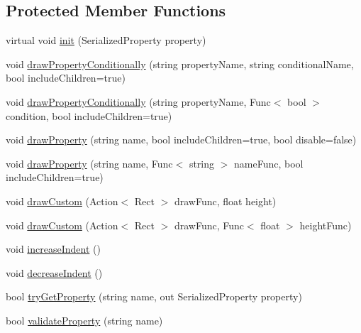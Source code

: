 \subsection*{Protected Member Functions}
\begin{DoxyCompactItemize}
\item 
virtual void \mbox{\hyperlink{class_leap_1_1_unity_1_1_custom_property_drawer_base_a1db92388446d13bf0e497f47b4fbc06a}{init}} (Serialized\+Property property)
\item 
void \mbox{\hyperlink{class_leap_1_1_unity_1_1_custom_property_drawer_base_ae8ffab0ab4a37260bbd0855e530c21f3}{draw\+Property\+Conditionally}} (string property\+Name, string conditional\+Name, bool include\+Children=true)
\item 
void \mbox{\hyperlink{class_leap_1_1_unity_1_1_custom_property_drawer_base_ab4f0ecabdcb89d099b1b9ad6c71f1e0d}{draw\+Property\+Conditionally}} (string property\+Name, Func$<$ bool $>$ condition, bool include\+Children=true)
\item 
void \mbox{\hyperlink{class_leap_1_1_unity_1_1_custom_property_drawer_base_a4e6c925f85520c7ffdb8498fed683d22}{draw\+Property}} (string name, bool include\+Children=true, bool disable=false)
\item 
void \mbox{\hyperlink{class_leap_1_1_unity_1_1_custom_property_drawer_base_a5490dfb02384c005ddd9d65c39e72132}{draw\+Property}} (string name, Func$<$ string $>$ name\+Func, bool include\+Children=true)
\item 
void \mbox{\hyperlink{class_leap_1_1_unity_1_1_custom_property_drawer_base_a8fc359bb586463a7b8c7672c7dd1cc60}{draw\+Custom}} (Action$<$ Rect $>$ draw\+Func, float height)
\item 
void \mbox{\hyperlink{class_leap_1_1_unity_1_1_custom_property_drawer_base_a6fc64f4861bd0657b3a9a97140a996b5}{draw\+Custom}} (Action$<$ Rect $>$ draw\+Func, Func$<$ float $>$ height\+Func)
\item 
void \mbox{\hyperlink{class_leap_1_1_unity_1_1_custom_property_drawer_base_a2a57e8f6b5ac89d2616b44f4819dc117}{increase\+Indent}} ()
\item 
void \mbox{\hyperlink{class_leap_1_1_unity_1_1_custom_property_drawer_base_aa29f79e7f8dc83ff5625aee15a60087b}{decrease\+Indent}} ()
\item 
bool \mbox{\hyperlink{class_leap_1_1_unity_1_1_custom_property_drawer_base_a9a48ff6212e10ab69a24c538226a8466}{try\+Get\+Property}} (string name, out Serialized\+Property property)
\item 
bool \mbox{\hyperlink{class_leap_1_1_unity_1_1_custom_property_drawer_base_a7b61387c6f2b8fd23cf9260000a1152f}{validate\+Property}} (string name)
\end{DoxyCompactItemize}



